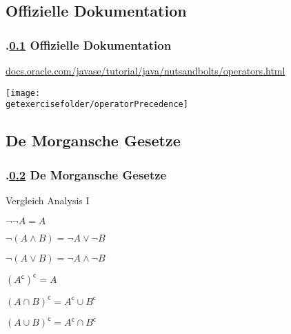 \def\stitle{Offizielle Dokumentation}
\subsection{\stitle}\label{S:Dokumentation}
\begin{frame}[fragile]%
  \frametitle{\kap.\ref{S:Dokumentation} \stitle}%
\textcolor{KITblue}{\url{docs.oracle.com/javase/tutorial/java/nutsandbolts/operators.html}}

\begin{center}
\texttt{[image: \\getexercisefolder/operatorPrecedence]}
\end{center}
\end{frame}

\def\stitle{De Morgansche Gesetze}
\subsection{\stitle}\label{S:Morgansche}
\begin{frame}[fragile]%
  \frametitle{\kap.\ref{S:Morgansche} \stitle}%
Vergleich Analysis I
\medskip

\begin{description}
  \item[und bzw. oder]
  \item $\neg \neg A = A$
  \item $\neg (A \wedge B) = \neg A \vee \neg B$
  \item $\neg (A \vee B) = \neg A \wedge \neg B$
\end{description}
\medskip

\begin{description}
  \item[Schnittmenge bzw. Vereinigung]
  \item $(A^{\mathsf{c}})^{\mathsf{c}} = A$
  \item $(A \cap B)^{\mathsf{c}} = A^{\mathsf{c}} \cup B^{\mathsf{c}}$
  \item $(A \cup B)^{\mathsf{c}} = A^{\mathsf{c}} \cap B^{\mathsf{c}}$
\end{description}

\end{frame}
